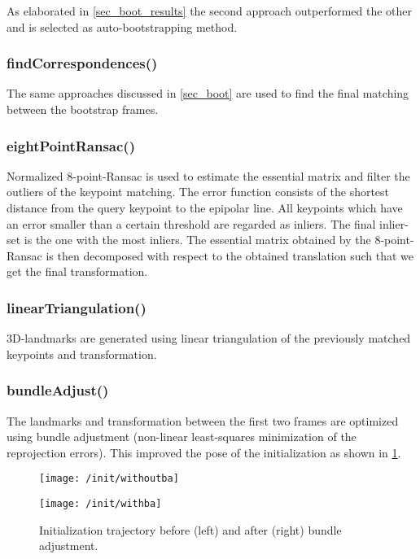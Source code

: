As elaborated in \cref{sec_boot_results} the second approach outperformed the other and is selected as auto-bootstrapping method.


\subsubsection{findCorrespondences()}
The same approaches discussed in \cref{sec_boot} are used to find the final matching between the bootstrap frames.


\subsubsection{eightPointRansac()}
Normalized 8-point-Ransac is used to estimate the essential matrix and filter the outliers of the keypoint matching.
The error function consists of the shortest distance from the query keypoint to the epipolar line. All keypoints which have an error smaller than a certain threshold are regarded as inliers. The final inlier-set is the one with the most inliers.
The essential matrix obtained by the 8-point-Ransac is then decomposed with respect to the obtained translation such that we get the final transformation.

\subsubsection{linearTriangulation()}
3D-landmarks are generated using linear triangulation of the previously matched keypoints and transformation.

\subsubsection{bundleAdjust()}
The landmarks and transformation between the first two frames are optimized using bundle adjustment (non-linear least-squares minimization of the reprojection errors). This improved the pose of the initialization as shown in \cref{fig:ba_init}.
\begin{figure}[ht]
	\centering
	\begin{minipage}{.4\textwidth}
		\centering
		\texttt{[image: /init/withoutba]}
	\end{minipage}
	\begin{minipage}{.4\textwidth}
		\centering
		\texttt{[image: /init/withba]}
	\end{minipage}
	\caption{Initialization trajectory before (left) and after (right) bundle adjustment.} 
	\label{fig:ba_init}
\end{figure}


